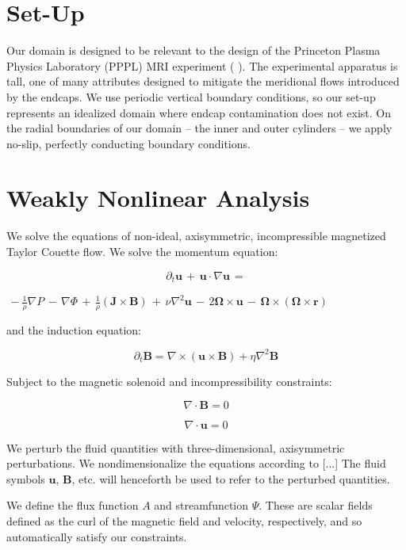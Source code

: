 \documentclass{emulateapj}
\newcommand{\beq}{\begin{equation}}
\newcommand{\eeq}{\end{equation}}
\newcommand{\citei}[1]{\citeauthor{#1} \citeyear{#1}}
\begin{document}
\section{Set-Up}

Our domain is designed to be relevant to the design of the Princeton Plasma Physics Laboratory (PPPL) MRI experiment (\citei{Ji:2001kd}). The experimental apparatus is tall, one of many attributes designed to mitigate the meridional flows introduced by the endcaps. We use periodic vertical boundary conditions, so our set-up represents an idealized domain where endcap contamination does not exist. On the radial boundaries of our domain --  the inner and outer cylinders -- we apply no-slip, perfectly conducting boundary conditions.

\section{Weakly Nonlinear Analysis}

We solve the equations of non-ideal, axisymmetric, incompressible magnetized Taylor Couette flow. We solve the momentum equation:

\beq
\partial_t \mathbf{u} \, + \, \mathbf{u} \cdot \nabla \mathbf{u} \, = 
\eeq

$\, -\frac{1}{\rho}\nabla P \, - \, \nabla\Phi \, + \, \frac{1}{\rho} \left(\mathbf{J}\times\mathbf{B}\right) \, + \, \nu\nabla^2 \mathbf{u} \, - \, 2\mathbf{\Omega} \times \mathbf{u} \, - \, \mathbf{\Omega} \times \left(\mathbf{\Omega} \times \mathbf{r} \right)$


and the induction equation:

\beq
\partial_t \mathbf{B} = \nabla \times \left(\mathbf{u} \times \mathbf{B}\right) + \eta\nabla^2\mathbf{B}
\eeq

Subject to the magnetic solenoid and incompressibility constraints:

\beq
\nabla \cdot \mathbf{B} = 0
\eeq

\beq
\nabla \cdot \mathbf{u} = 0
\eeq

We perturb the fluid quantities with three-dimensional, axisymmetric perturbations. We nondimensionalize the equations according to [...]
The fluid symbols $\mathbf{u}$, $\mathbf{B}$, etc. will henceforth be used to refer to the perturbed quantities.

We define the flux function $A$ and streamfunction $\Psi$. These are scalar fields defined as the curl of the magnetic field and velocity, respectively, and so automatically satisfy our constraints.
\end{document}
